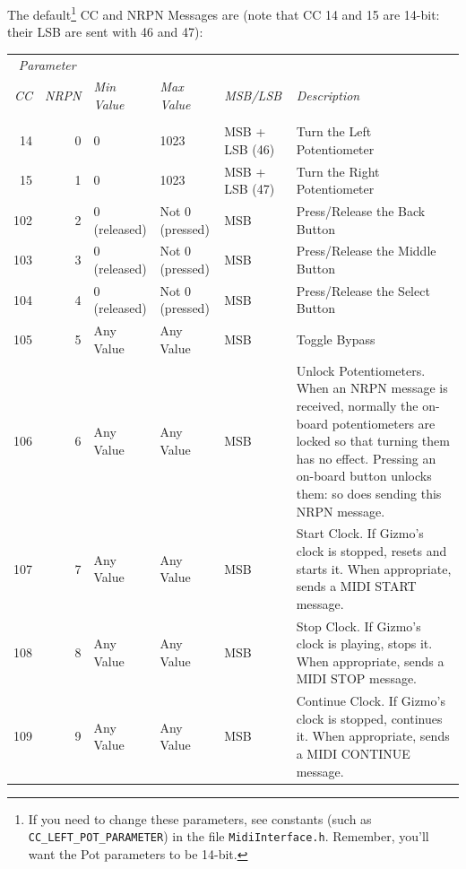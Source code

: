 \documentclass{article}
\begin{document}
\begin{description}
		The default\footnote{If you need to change these parameters, see constants (such as \texttt{CC\_LEFT\_POT\_PARAMETER}) in the file \texttt{MidiInterface.h}.  Remember, you'll want the Pot parameters to be 14-bit.} CC and NRPN Messages are (note that CC 14 and 15 are 14-bit: their LSB are sent with 46 and 47):
		
		\noindent\hspace{-1.5em}\begin{tabular}{@{}rr|lllp{2.4in}@{}}
		\multicolumn{2}{c}{\it Parameter}\\
		{\it CC}&{\it \hspace{-0.8em} NRPN}&{\it Min  Value}&{\it Max Value}&{\it MSB/LSB}&{\it Description}\\[0.1em]
		\hline\\[-0.9em]
		14&0	&0	& 1023 & MSB + LSB (46)& Turn the Left Potentiometer\\
		15&1	&0	& 1023 & MSB + LSB (47) & Turn the Right Potentiometer\\
		102&2	&0 (released)	&Not 0 (pressed) & MSB& Press/Release the Back Button\\
		103&3	&0 (released)	&Not 0  (pressed) & MSB & Press/Release the Middle Button\\
		104&4	&0 (released)	&Not 0 (pressed) & MSB & Press/Release the Select Button\\
		105&5	&Any Value	&Any Value & MSB& Toggle Bypass\\
		106&6	& Any Value &Any Value & MSB& Unlock Potentiometers.  When an NRPN message is received, normally the on-board potentiometers are locked so that turning them has no effect.  Pressing an on-board button unlocks them: so does sending this NRPN message.\\
		107&7	&	Any Value &Any Value & MSB& Start Clock.  If Gizmo's clock is stopped, resets and starts it.  When appropriate, sends a MIDI START message.\\
		108&8	& Any Value	&Any Value & MSB& Stop Clock.  If Gizmo's clock is playing, stops it.  When appropriate, sends a MIDI STOP message.\\
		109&9	&	Any Value &Any Value & MSB & Continue Clock.    If Gizmo's clock is stopped, continues it.  When appropriate, sends a MIDI CONTINUE message.\\
		\end{tabular}


\end{description}
\end{document}

